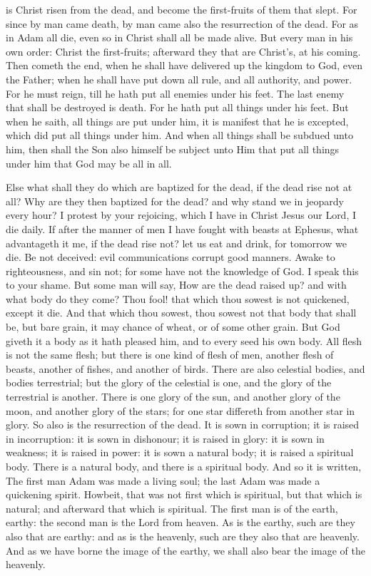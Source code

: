  is Christ risen from the dead, and become the first-fruits of them that slept. For since by man came death, by man came also the resurrection of the dead. For as in Adam all die, even so in Christ shall all be made alive. But every man in his own order: Christ the first-fruits; afterward they that are Christ's, at his coming. Then cometh the end, when he shall have delivered up the kingdom to God, even the Father; when he shall have put down all rule, and all authority, and power. For he must reign, till he hath put all enemies under his feet. The last enemy that shall be destroyed is death. For he hath put all things under his feet. But when he saith, all things are put under him, it is manifest that he is excepted, which did put all things under him. And when all things shall be subdued unto him, then shall the Son also himself be subject unto Him that put all things under him that God may be all in all.\par
Else what shall they do which are baptized for the dead, if the dead rise not at all? Why are they then baptized for the dead? and why stand we in jeopardy every hour? I protest by your rejoicing, which I have in Christ Jesus our Lord, I die daily. If after the manner of men I have fought with beasts at Ephesus, what advantageth it me, if the dead rise not? let us eat and drink, for tomorrow we die. Be not deceived: evil communications corrupt good manners. Awake to righteousness, and sin not; for some have not the knowledge of God. I speak this to your shame. But some man will say, How are the dead raised up? and with what body do they come? Thou fool! that which thou sowest is not quickened, except it die. And that which thou sowest, thou sowest not that body that shall be, but bare grain, it may chance of wheat, or of some other grain. But God giveth it a body as it hath pleased him, and to every seed his own body. All flesh is not the same flesh; but there is one kind of flesh of men, another flesh of beasts, another of fishes, and another of birds. There are also celestial bodies, and bodies terrestrial; but the glory of the celestial is one, and the glory of the terrestrial is another. There is one glory of the sun, and another glory of the moon, and another glory of the stars; for one star differeth from another star in glory. So also is the resurrection of the dead. It is sown in corruption; it is raised in incorruption: it is sown in dishonour; it is raised in glory: it is sown in weakness; it is raised in power: it is sown a natural body; it is raised a spiritual body. There is a natural body, and there is a spiritual body. And so it is written, The first man Adam was made a living soul; the last Adam was made a quickening spirit. Howbeit, that was not first which is spiritual, but that which is natural; and afterward that which is spiritual. The first man is of the earth, earthy: the second man is the Lord from heaven. As is the earthy, such are they also that are earthy: and as is the heavenly, such are they also that are heavenly. And as we have borne the image of the earthy, we shall also bear the image of the heavenly.\par
